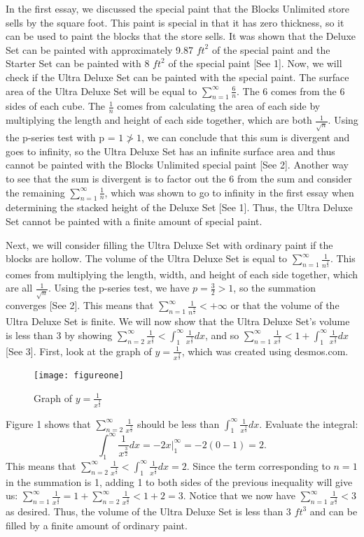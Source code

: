 \documentclass[12pt]{article}
\begin{document}
In the first essay, we discussed the special paint that the Blocks Unlimited store sells by the square foot. This paint is special in that it has zero thickness, so it can be used to paint the blocks that the store sells. It was shown that the Deluxe Set can be painted with approximately 9.87  ${ft}^2$ of the special paint and the Starter Set can be painted with 8  ${ft}^2$ of the special paint [See 1]. Now, we will check if the Ultra Deluxe Set can be painted with the special paint. The surface area of the Ultra Deluxe Set will be equal to $\sum_{n=1}^{\infty}\frac{6}{n}$. The 6 comes from the 6 sides of each cube. The $\frac1n$ comes from calculating the area of each side by multiplying the length and height of each side together, which are both $\frac{1}{\sqrt{n}}$. Using the p-series test with p = $1 \ngtr1$, we can conclude that this sum is divergent and goes to infinity, so the Ultra Deluxe Set has an infinite surface area and thus cannot be painted with the Blocks Unlimited special paint [See 2]. Another way to see that the sum is divergent is to factor out the 6 from the sum and consider the remaining $\sum_{n=1}^{\infty}\frac1n$, which was shown to go to infinity in the first essay when determining the stacked height of the Deluxe Set [See 1]. Thus, the Ultra Deluxe Set cannot be painted with a finite amount of special paint.

Next, we will consider filling the Ultra Deluxe Set with ordinary paint if the blocks are hollow. The volume of the Ultra Deluxe Set is equal to $\sum_{n=1}^{\infty}\frac{1}{n^{\frac32}}$. This comes from multiplying the length, width, and height of each side together, which are all $\frac{1}{\sqrt{n}}$. Using the p-series test, we have $p=\frac32>1$, so the summation converges [See 2]. This means that $\sum_{n=1}^{\infty}\frac{1}{n^{\frac32}}<+\infty$ or that the volume of the Ultra Deluxe Set is finite. We will now show that the Ultra Deluxe Set's volume is less than 3 by showing  $\sum_{n=2}^{\infty}\frac1{x^\frac32}<\int_1^{\infty}\frac1{x^\frac32}dx$, and so  $\sum_{n=1}^{\infty}\frac1{x^\frac32}<1+\int_1^{\infty}\frac1{x^\frac32}dx$ [See 3]. First, look at the graph of $y=\frac1{x^\frac32}$, which was created using desmos.com.

\begin{figure}[H]
	\caption{Graph of $y=\frac1{x^\frac32}$}
	\texttt{[image: figureone]}
\end{figure}

Figure 1 shows that $\sum_{n=2}^{\infty}\frac1{x^\frac32}$ should be less than $\int_1^{\infty}\frac1{x^\frac32}dx$. Evaluate the integral:
\[
	\int_1^{\infty}\frac1{x^\frac32}dx=-2x|_1^\infty=-2(0-1)=2.
\]
This means that $\sum_{n=2}^{\infty}\frac1{x^\frac32}<\int_1^{\infty}\frac1{x^\frac32}dx=2$. Since the term corresponding to $n=1$ in the summation is 1, adding 1 to both sides of the previous inequality will give us: $\sum_{n=1}^{\infty}\frac1{x^\frac32}=1+\sum_{n=2}^{\infty}\frac1{x^\frac32}<1+2=3$. Notice that we now have $\sum_{n=1}^{\infty}\frac{1}{x^\frac32}<3$ as desired. Thus, the volume of the Ultra Deluxe Set is less than 3 $ft^3$ and can be filled by a finite amount of ordinary paint.
\end{document}
